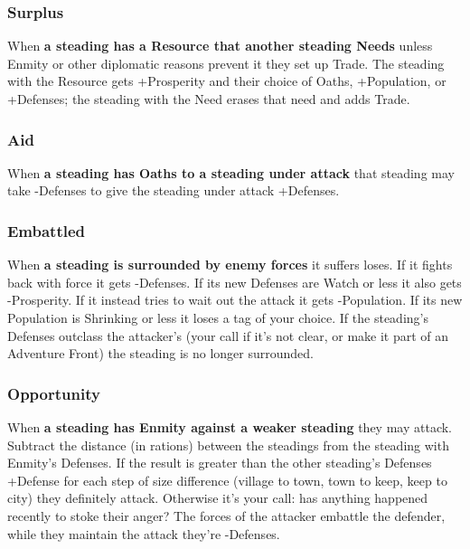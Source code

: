        
\subsubsection{Surplus}   
       

When {\bf a steading has a Resource that another steading Needs}  unless Enmity or other diplomatic reasons prevent it they set up Trade. The steading with the Resource gets +Prosperity and their choice of Oaths, +Population, or +Defenses; the steading with the Need erases that need and adds Trade.

       
\subsubsection{Aid}   
       

When {\bf a steading has Oaths to a steading under attack}  that steading may take -Defenses to give the steading under attack +Defenses.

       
\subsubsection{Embattled}   
       

When {\bf a steading is surrounded by enemy forces}  it suffers loses. If it fights back with force it gets -Defenses. If its new Defenses are Watch or less it also gets -Prosperity. If it instead tries to wait out the attack it gets -Population. If its new Population is Shrinking or less it loses a tag of your choice. If the steading's Defenses outclass the attacker's (your call if it's not clear, or make it part of an Adventure Front) the steading is no longer surrounded.

       
\subsubsection{Opportunity}   
       

When {\bf a steading has Enmity against a weaker steading}  they may attack. Subtract the distance (in rations) between the steadings from the steading with Enmity's Defenses. If the result is greater than the other steading's Defenses +Defense for each step of size difference (village to town, town to keep, keep to city) they definitely attack. Otherwise it's your call: has anything happened recently to stoke their anger? The forces of the attacker embattle the defender, while they maintain the attack they're -Defenses.

